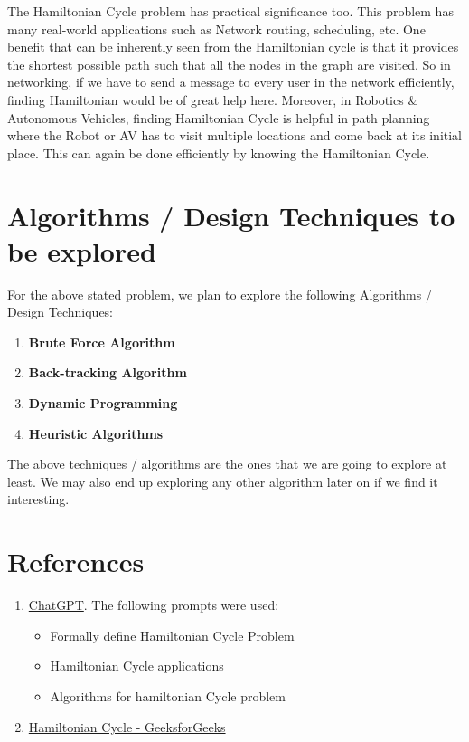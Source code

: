 \documentclass[12pt]{article}
\begin{document}
The Hamiltonian Cycle problem has practical significance too. This problem has many real-world applications such as Network routing, scheduling, etc. One benefit that can be inherently seen from the Hamiltonian cycle is that it provides the shortest possible path such that all the nodes in the graph are visited. So in networking, if we have to send a message to every user in the network efficiently, finding Hamiltonian would be of great help here. Moreover, in Robotics \& Autonomous Vehicles, finding Hamiltonian Cycle is helpful in path planning where the Robot or AV has to visit multiple locations and come back at its initial place. This can again be done efficiently by knowing the Hamiltonian Cycle.
\section*{Algorithms / Design Techniques to be explored}
For the above stated problem, we plan to explore the following Algorithms / Design Techniques:
\begin{enumerate}
    \item \textbf{Brute Force Algorithm}
    \item \textbf{Back-tracking Algorithm}
    \item \textbf{Dynamic Programming}
    \item \textbf{Heuristic Algorithms}
\end{enumerate}
The above techniques / algorithms are the ones that we are going to explore at least. We may also end up exploring any other algorithm later on if we find it interesting.
\section*{References}
\begin{enumerate}
    \item \href{https://chat.openai.com/chat}{ChatGPT}. The following prompts were used:
          \begin{itemize}
              \item Formally define Hamiltonian Cycle Problem
              \item Hamiltonian Cycle applications
              \item Algorithms for hamiltonian Cycle problem
          \end{itemize}
    \item \href{https://www.geeksforgeeks.org/hamiltonian-cycle/}{Hamiltonian Cycle - GeeksforGeeks}
\end{enumerate}
\end{document}
